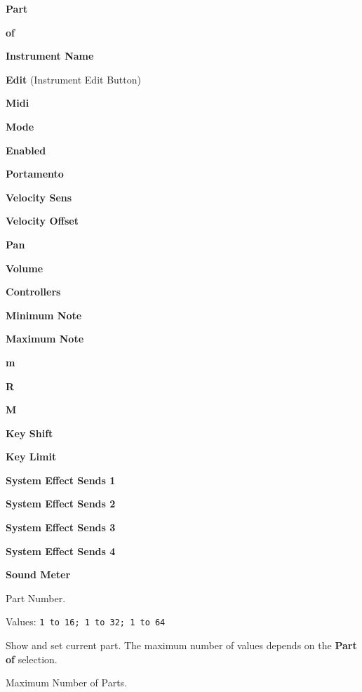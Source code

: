    \begin{enumber}
      \item \textbf{Part}
      \item \textbf{of}
      \item \textbf{Instrument Name}
      \item \textbf{Edit} (Instrument Edit Button)
      \item \textbf{Midi}
      \item \textbf{Mode}
      \item \textbf{Enabled}
      \item \textbf{Portamento}
      \item \textbf{Velocity Sens}
      \item \textbf{Velocity Offset}
      \item \textbf{Pan}
      \item \textbf{Volume}
      \item \textbf{Controllers}
      \item \textbf{Minimum Note}
      \item \textbf{Maximum Note}
      \item \textbf{m}
      \item \textbf{R}
      \item \textbf{M}
      \item \textbf{Key Shift}
      \item \textbf{Key Limit}
      \item \textbf{System Effect Sends 1}
      \item \textbf{System Effect Sends 2}
      \item \textbf{System Effect Sends 3}
      \item \textbf{System Effect Sends 4}
      \item \textbf{Sound Meter}
   \end{enumber}

   \setcounter{ItemCounter}{0}      %

   Part Number.

   Values: \texttt{1 to 16; 1 to 32; 1 to 64 }

   Show and set current part.  The maximum number of values depends on the
   \textbf{Part of} selection.

   Maximum Number of Parts.


